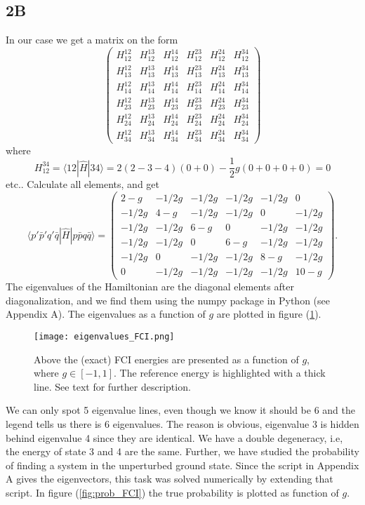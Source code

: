 \documentclass[norsk,a4paper,12pt]{article}
\begin{document}
\subsection*{2B}
In our case we get a matrix on the form
\begin{equation*}
\begin{pmatrix} 
H_{12}^{12}&H_{12}^{13}&H_{12}^{14}&H_{12}^{23}&H_{12}^{24}&H_{12}^{34}\\
H_{13}^{12}&H_{13}^{13}&H_{13}^{14}&H_{13}^{23}&H_{13}^{24}&H_{13}^{34}\\
H_{14}^{12}&H_{14}^{13}&H_{14}^{14}&H_{14}^{23}&H_{14}^{24}&H_{14}^{34}\\
H_{23}^{12}&H_{23}^{13}&H_{23}^{14}&H_{23}^{23}&H_{23}^{24}&H_{23}^{34}\\
H_{24}^{12}&H_{24}^{13}&H_{24}^{14}&H_{24}^{23}&H_{24}^{24}&H_{24}^{34}\\
H_{34}^{12}&H_{34}^{13}&H_{34}^{14}&H_{34}^{23}&H_{34}^{24}&H_{34}^{34} \end{pmatrix}
\end{equation*}
where 
\begin{equation*}
H_{12}^{34}=\langle 12|\hat{H}|34\rangle=2(2-3-4)(0+0)-\frac{1}{2}g(0+0+0+0)=0
\end{equation*}
etc.. Calculate all elements, and get
\begin{equation}
\langle p'\bar{p}'q'\bar{q}|\hat{H}|p\bar{p}q\bar{q}\rangle=\begin{pmatrix} 
2-g&-1/2g&-1/2g&-1/2g&-1/2g&0\\
-1/2g&4-g&-1/2g&-1/2g&0&-1/2g\\
-1/2g&-1/2g&6-g&0&-1/2g&-1/2g\\
-1/2g&-1/2g&0&6-g&-1/2g&-1/2g\\
-1/2g&0&-1/2g&-1/2g&8-g&-1/2g\\
0&-1/2g&-1/2g&-1/2g&-1/2g&10-g \end{pmatrix}.
\label{eq:FCI_matrix}
\end{equation}
The eigenvalues of the Hamiltonian are the diagonal elements after diagonalization, and we find them using the numpy package in Python (see Appendix A). The eigenvalues as a function of $g$ are plotted in figure (\ref{fig:eigenvalues_FCI}).
\begin{figure}[h]
\centering
\texttt{[image: eigenvalues\_FCI.png]}
\caption{Above the (exact) FCI energies are presented as a function of $g$, where $g\in[-1,1]$. The reference energy is highlighted with a thick line. See text for further description. \label{fig:eigenvalues_FCI}}
\end{figure}
We can only spot 5 eigenvalue lines, even though we know it should be 6 and the legend tells us there is 6 eigenvalues. The reason is obvious, eigenvalue 3 is hidden behind eigenvalue 4 since they are identical. We have a double degeneracy, i.e, the energy of state 3 and 4 are the same. Further, we have studied the probability of finding a system in the unperturbed ground state. Since the script in Appendix A gives the eigenvectors, this task was solved numerically by extending that script. In figure (\ref{fig:prob_FCI}) the true probability is plotted as function of $g$.
\end{document}
